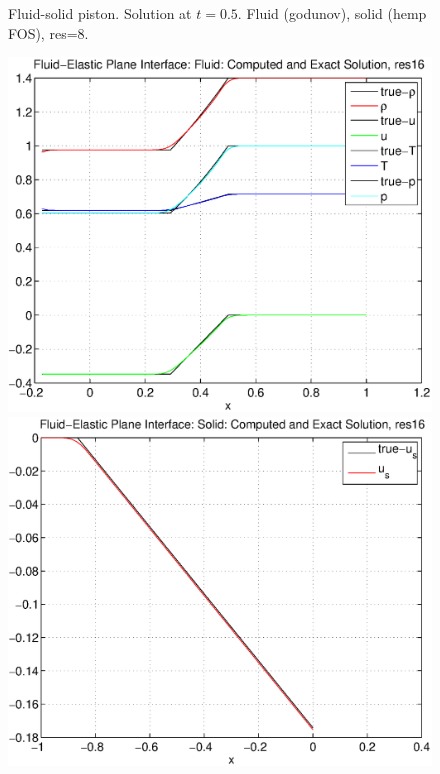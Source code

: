 {\begin{figure}[h]
\caption{Fluid-solid piston. Solution at $t=0.5$. Fluid (godunov), solid (hemp FOS), res=8.}
\label{fig:fluidSolidPistonFOSG8}
\end{figure}
% 
\clearpage
\begin{figure}[hbt]
\includegraphics[width=\fwidth]{fluidElastic_planeInterfaceFluid_res16.eps}
\includegraphics[width=\fwidth]{fluidElastic_planeInterfaceSolid_res16.eps}

\end{figure}}
